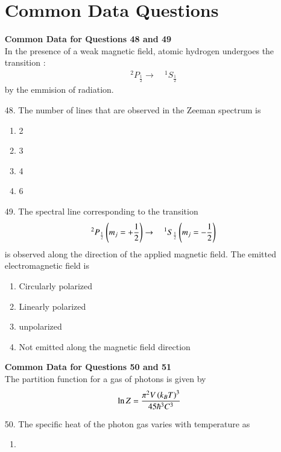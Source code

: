\documentclass[journal,12pt,onecolumn]{IEEEtran}
\theoremstyle{remark}
\begin{document}
\begin{enumerate}
\section{\textbf{Common Data Questions}}
\textbf{Common Data for Questions 48 and 49}\\
In the presence of a weak magnetic field, atomic hydrogen undergoes the transition :
\begin{align}
    {\quad}^2 P_{\frac{1}{2}} \rightarrow {\quad}^1 S_{\frac{1}{2}}
\end{align}
by the emmision of radiation.
        \item[48.] The number of lines that are observed in the Zeeman spectrum is
            \hfill{}
            \begin{enumerate}
                \item 2
                \item 3
                \item 4
                \item 6
            \end{enumerate}
        \item[49.] The spectral line corresponding to the transition 
            \begin{align}
                {\quad}^2 P_{\frac{1}{2}}\left(m_j = + \frac{1}{2}\right) \rightarrow {\quad}^1 S_{\frac{1}{2}}\left(m_j = -\frac{1}{2}\right)
            \end{align}
            is observed along the direction of the applied magnetic field. The emitted electromagnetic
            field is
            \hfill{}
            \begin{enumerate}
                \item Circularly polarized
                \item Linearly polarized
                \item unpolarized
                \item Not emitted along the magnetic field direction
            \end{enumerate}
            \textbf{Common Data for Questions 50 and 51}\\
            The partition function for a gas of photons is given by
            \begin{align}
                \ln Z = \frac{\pi^2 V\left(k_B T\right)^3}{45\hbar ^3 C^3}
            \end{align}
        \item[50.] The specific heat of the photon gas varies with temperature as 
            \hfill{}
            \begin{enumerate}
                \item 
                    \begin{center}
\end{center}
\end{enumerate}
\end{enumerate}
\end{document}
